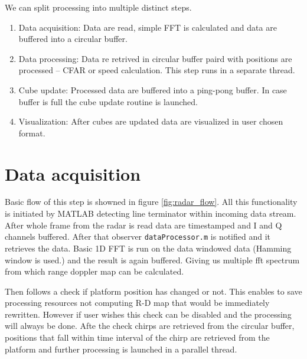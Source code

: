We can split processing into multiple distinct steps.
\begin{enumerate}
  \item Data acquisition: Data are read, simple FFT is calculated and data are buffered into a circular buffer.
  \item Data processing: Data re retrived in circular buffer paird with positions are processed -- CFAR or speed calculation. This step runs in a separate thread.
  \item Cube update: Processed data are buffered into a ping-pong buffer. In case buffer is full the cube update routine is launched.
  \item Visualization: After cubes are updated data are visualized in user chosen format.
\end{enumerate}

\section{Data acquisition}

Basic flow of this step is showned in figure \ref{fig:radar_flow}.
All this functionality is initiated by MATLAB detecting line terminator within incoming data stream.
After whole frame from the radar is read data are timestamped and I and Q channels buffered.
After that observer \texttt{dataProcessor.m} is notified and it retrieves the data.
Basic 1D FFT is run on the data windowed data (Hamming window is used.) and the result is again buffered.
Giving us multiple fft spectrum from which range doppler map can be calculated.

Then follows a check if platform position has changed or not.
This enables to save processing resources not computing R-D map that would be immediately rewritten.
However if user wishes this check can be disabled and the processing will always be done.
Afte the check chirps are retrieved from the circular buffer, positions that fall within time interval of the chirp are retrieved from the platform and further processing is launched in a parallel thread.



